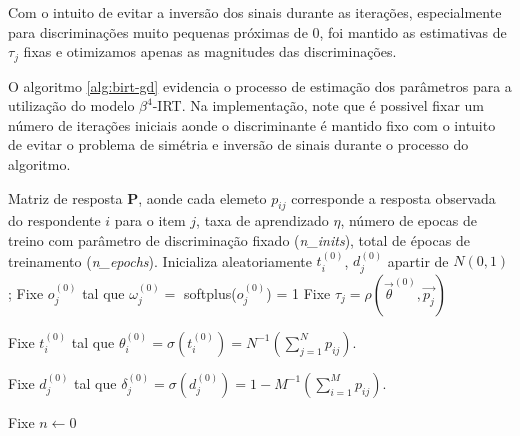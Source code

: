 Com o intuito de evitar a inversão dos sinais durante as iterações, especialmente para discriminações muito pequenas próximas de 0, foi mantido as estimativas de $\tau_j$ fixas e otimizamos apenas as magnitudes das discriminações.

O algoritmo \ref{alg:birt-gd} evidencia o processo de estimação dos parâmetros para a utilização do modelo $\beta^4$-\gls{IRT}. Na implementação, note que é possivel fixar um número de iterações iniciais aonde o discriminante é mantido fixo com o intuito de evitar o problema de simétria e inversão de sinais durante o processo do algoritmo.


\begin{algorithm}[!htp]
\caption{$\beta^{4}$-IRT com irfomação a priori} 
\label{alg:birt-gd}
\begin{algorithmic}[1]
\Require Matriz de resposta $\mathbf{P}$, aonde cada elemeto $p_{ij}$ corresponde a resposta observada do respondente $i$ para o item $j$, taxa de aprendizado $\eta$, número de epocas de treino com parâmetro de discriminação fixado (\textit{n\_inits}), total de épocas de treinamento (\textit{n\_epochs}).
\State Inicializa aleatoriamente $t_i^{(0)}$, $d_j^{(0)}$ apartir de $N(0, 1)$;
\State Fixe $o_j^{(0)}$ tal que $\omega_j^{(0)} = $ softplus($o_j^{(0)}$) = 1%
\State Fixe $\tau_j = \rho(\vec{\theta}^{(0)}, \vec{p_j})$ 
 
\State Fixe $t_i^{(0)}$ tal que $\theta_i^{(0)} = \sigma(t_i^{(0)}) = N^{-1}\left(\sum_{j=1}^N p_{ij}\right)$.
    
\State Fixe $d_j^{(0)}$ tal que $\delta_j^{(0)} = \sigma(d_j^{(0)}) = 1 - M^{-1}\left(\sum_{i=1}^M p_{ij}\right)$.

\State Fixe $n \leftarrow 0$



\end{algorithmic}
\end{algorithm}
